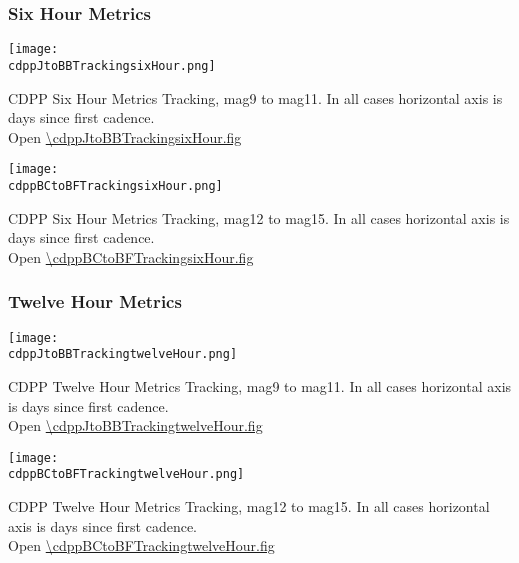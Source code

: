 \clearpage
\subsubsection{Six Hour Metrics}

\begin{center}
\texttt{[image: \\cdppJtoBBTrackingsixHour.png]}
\end{center}
CDPP Six Hour Metrics Tracking, mag9 to mag11. In all cases
horizontal axis is days since first cadence.\\
Open \url{\cdppJtoBBTrackingsixHour.fig}

\clearpage
\begin{center}
\texttt{[image: \\cdppBCtoBFTrackingsixHour.png]}
\end{center}
CDPP Six Hour Metrics Tracking, mag12 to mag15. In all cases
horizontal axis is days since first cadence.\\
Open \url{\cdppBCtoBFTrackingsixHour.fig}

\clearpage
\subsubsection{Twelve Hour Metrics}

\begin{center}
\texttt{[image: \\cdppJtoBBTrackingtwelveHour.png]}
\end{center}
CDPP Twelve Hour Metrics Tracking, mag9 to mag11. In all cases
horizontal axis is days since first cadence.\\
Open \url{\cdppJtoBBTrackingtwelveHour.fig}

\clearpage
\begin{center}
\texttt{[image: \\cdppBCtoBFTrackingtwelveHour.png]}
\end{center}
CDPP Twelve Hour Metrics Tracking, mag12 to mag15. In all cases
horizontal axis is days since first cadence.\\
Open \url{\cdppBCtoBFTrackingtwelveHour.fig}


